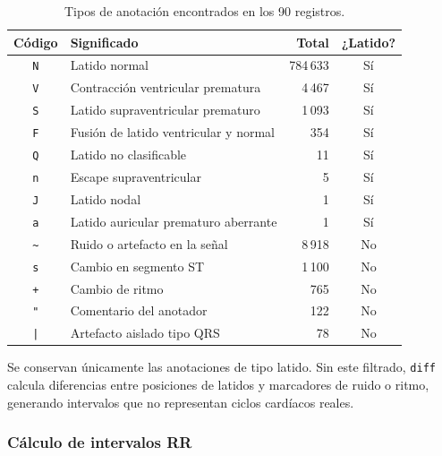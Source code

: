 \begin{table}[H]
\centering
\caption{Tipos de anotación encontrados en los 90 registros.}
\label{tab:anntype}
\renewcommand{\arraystretch}{1.2}
\begin{tabular}{clrc}
    \toprule
    \textbf{Código} & \textbf{Significado} & \textbf{Total} & \textbf{¿Latido?} \\
    \midrule
    \texttt{N} & Latido normal                              & 784\,633 & Sí \\
    \texttt{V} & Contracción ventricular prematura           &   4\,467 & Sí \\
    \texttt{S} & Latido supraventricular prematuro           &   1\,093 & Sí \\
    \texttt{F} & Fusión de latido ventricular y normal       &     354  & Sí \\
    \texttt{Q} & Latido no clasificable                      &      11  & Sí \\
    \texttt{n} & Escape supraventricular                     &       5  & Sí \\
    \texttt{J} & Latido nodal                                &       1  & Sí \\
    \texttt{a} & Latido auricular prematuro aberrante        &       1  & Sí \\
    \midrule
    \texttt{\textasciitilde} & Ruido o artefacto en la señal &   8\,918 & No \\
    \texttt{s} & Cambio en segmento ST                       &   1\,100 & No \\
    \texttt{+} & Cambio de ritmo                             &     765  & No \\
    \texttt{"} & Comentario del anotador                     &     122  & No \\
    \texttt{|} & Artefacto aislado tipo QRS                  &      78  & No \\
    \bottomrule
\end{tabular}
\end{table}

Se conservan únicamente las anotaciones de tipo latido. Sin este filtrado,
\texttt{diff} calcula diferencias entre posiciones de latidos y marcadores
de ruido o ritmo, generando intervalos que no representan ciclos cardíacos
reales.

\subsubsection{Cálculo de intervalos RR}

